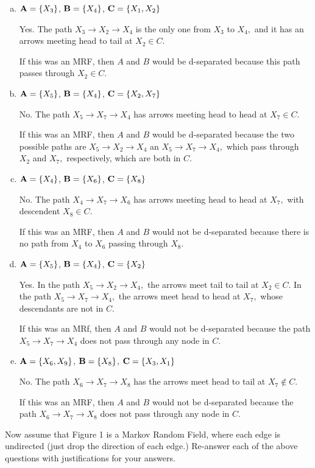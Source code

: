 \documentclass{article}
\begin{document}
\begin{enumerate}[a.]
	\item ${\bf A} = \{ X_3 \}$, ${\bf B} = \{ X_4 \}$, ${\bf C} = \{X_1,X_2\}$
		\begin{answer*}
			Yes. The path $X_3\to X_2\to X_4$ is the only one from $X_3$ to $X_4,$ and it has an arrows meeting head to tail at $X_2\in C.$

			If this was an MRF, then $A$ and $B$ would be d-separated because this path passes through $X_2\in C.$
		\end{answer*}

	\item ${\bf A} = \{ X_5 \}$, ${\bf B} = \{X_4\}$, ${\bf C} = \{X_2,X_7\}$
		\begin{answer*}
			No. The path $X_5\to X_7\to X_4$ has arrows meeting head to head at $X_7\in C.$

			If this was an MRF, then $A$ and $B$ would be d-separated because the two possible paths are $X_5\to X_2\to X_4$ an $X_5\to X_7\to X_4,$ which pass through $X_2$ and $X_7,$ respectively, which are both in $C.$
		\end{answer*}

	\item ${\bf A} = \{X_4\}$, ${\bf B} = \{X_6\}$, ${\bf C} = \{X_8\}$
		\begin{answer*}
			No. The path $X_4\to X_7\to X_6$ has arrows meeting head to head at $X_7,$ with descendent $X_8\in C.$

			If this was an MRF, then $A$ and $B$ would not be d-separated because there is no path from $X_4$ to $X_6$ passing through $X_8.$
		\end{answer*}

	\item ${\bf A} = \{X_5\}$, ${\bf B} = \{X_4\}$, ${\bf C} = \{X_2\}$
		\begin{answer*}
			Yes. In the path $X_5\to X_2\to X_4,$ the arrows meet tail to tail at $X_2\in C.$ In the path $X_5\to X_7\to X_4,$ the arrows meet head to head at $X_7,$ whose descendants are not in $C.$

			If this was an MRf, then $A$ and $B$ would not be d-separated because the path $X_5\to X_7\to X_4$ does not pass through any node in $C.$
		\end{answer*}

	\item ${\bf A} = \{X_6, X_9\}$, ${\bf B} = \{X_8\}$, ${\bf C} = \{X_3,X_1\}$
		\begin{answer*}
			No. The path $X_6\to X_7\to X_8$ has the arrows meet head to tail at $X_7\not\in C.$

			If this was an MRF, then $A$ and $B$ would not be d-separated because the path $X_6\to X_7\to X_8$ does not pass through any node in $C.$
		\end{answer*}

\end{enumerate}
Now assume that Figure 1 is a Markov Random Field, where each edge is undirected (just drop the direction of each edge.) Re-answer each of the above questions with justifications for your answers.
\end{document}
